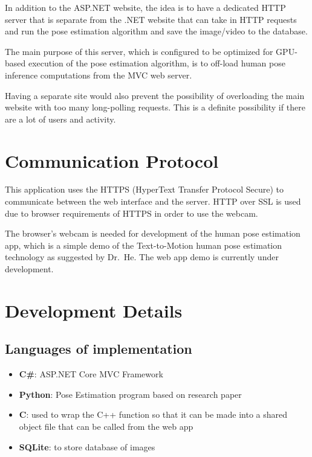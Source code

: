 \documentclass{scrreprt}
\begin{document}
In addition to the ASP.NET website, the idea is to have a dedicated HTTP server
that is separate from the .NET website that can take in HTTP requests and run
the pose estimation algorithm and save the image/video to the database.

The main purpose of this server, which is configured to be optimized for
GPU-based execution of the pose estimation algorithm, is to off-load human pose
inference computations from the MVC web server.

Having a separate site would also prevent the possibility of overloading the
main website with too many long-polling requests. This is a definite
possibility if there are a lot of users and activity.

\chapter{Communication Protocol}

This application uses the HTTPS (HyperText Transfer Protocol Secure) to
communicate between the web interface and the server. HTTP over SSL is used due
to browser requirements of HTTPS in order to use the webcam.

The browser's webcam is needed for development of the human pose estimation
app, which is a simple demo of the Text-to-Motion human pose estimation
technology as suggested by Dr.\ He. The web app demo is currently under
development.

\chapter{Development Details}

\section{Languages of implementation}

\begin{itemize}
    \item \textbf{C\#}: ASP.NET Core MVC Framework
    \item \textbf{Python}: Pose Estimation program based on research paper
    \item \textbf{C}: used to wrap the C++ function so that it can be made into a shared object file that can be called from the web app
    \item \textbf{SQLite}: to store database of images
\end{itemize}
\end{document}
